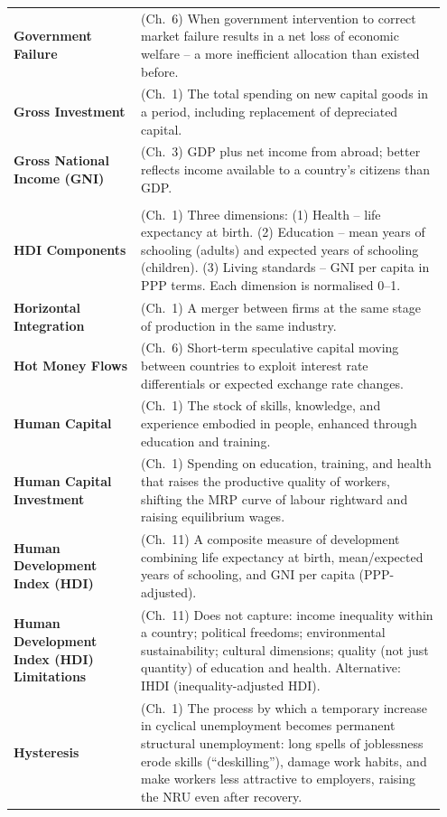 \documentclass[11pt, a4paper, twoside]{book}
\begin{document}
\begin{longtable}{@{}>{\RaggedRight\arraybackslash}p{0.28\linewidth}>{\RaggedRight\arraybackslash}p{0.67\linewidth}@{}}
\textbf{Government Failure} & (Ch.~6) When government intervention to correct market failure results in a net loss of economic welfare -- a more inefficient allocation than existed before. \\
\textbf{Gross Investment} & (Ch.~1) The total spending on new capital goods in a period, including replacement of depreciated capital. \\
\textbf{Gross National Income (GNI)} & (Ch.~3) GDP plus net income from abroad; better reflects income available to a country's citizens than GDP. \\

\multicolumn{2}{@{}l}{\textbf{\Large\color{CurveNavy} H}} \\[2pt]
\textbf{HDI Components} & (Ch.~1) Three dimensions: (1) Health -- life expectancy at birth. (2) Education -- mean years of schooling (adults) and expected years of schooling (children). (3) Living standards -- GNI per capita in PPP terms. Each dimension is normalised 0--1. \\
\textbf{Horizontal Integration} & (Ch.~1) A merger between firms at the same stage of production in the same industry. \\
\textbf{Hot Money Flows} & (Ch.~6) Short-term speculative capital moving between countries to exploit interest rate differentials or expected exchange rate changes. \\
\textbf{Human Capital} & (Ch.~1) The stock of skills, knowledge, and experience embodied in people, enhanced through education and training. \\
\textbf{Human Capital Investment} & (Ch.~1) Spending on education, training, and health that raises the productive quality of workers, shifting the MRP curve of labour rightward and raising equilibrium wages. \\
\textbf{Human Development Index (HDI)} & (Ch.~11) A composite measure of development combining life expectancy at birth, mean/expected years of schooling, and GNI per capita (PPP-adjusted). \\
\textbf{Human Development Index (HDI) Limitations} & (Ch.~11) Does not capture: income inequality within a country; political freedoms; environmental sustainability; cultural dimensions; quality (not just quantity) of education and health. Alternative: IHDI (inequality-adjusted HDI). \\
\textbf{Hysteresis} & (Ch.~1) The process by which a temporary increase in cyclical unemployment becomes permanent structural unemployment: long spells of joblessness erode skills (``deskilling''), damage work habits, and make workers less attractive to employers, raising the NRU even after recovery. \\


\end{longtable}
\end{document}
